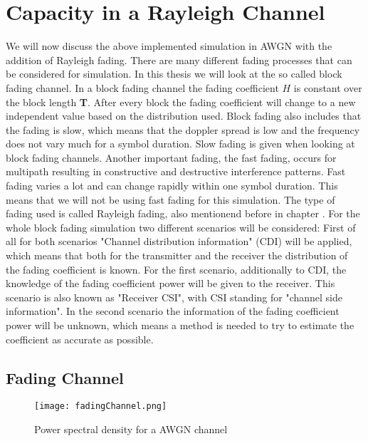 \chapter{Capacity in a Rayleigh Channel} 
\label{chap:raychan}
\graphicspath{{C:/Users/Kevin/Bachelarbeit/Bachelorarbeit/01_Bachelorarbeit_LaTex/02_Figures/}}


We will now discuss the above implemented simulation in AWGN with the addition of Rayleigh fading. 
There are many different fading processes that can be considered for simulation. In this thesis we will look at the so called block fading channel. In a block fading channel the fading coefficient $H$ is constant over the block length \textbf{T}. After every block the fading coefficient will change to a new independent value based on the distribution used. Block fading also includes that the fading is slow, which means that the doppler spread is low and the frequency does not vary much for a symbol duration. Slow fading is given when looking at block fading channels. Another important fading, the fast fading, occurs for multipath resulting in constructive and destructive interference patterns. Fast fading varies a lot and can change rapidly within one symbol duration. This means that we will not be using fast fading for this simulation.
The type of fading used is called Rayleigh fading, also mentionend before in chapter . For the whole block fading simulation two different scenarios will be considered:
\newline
First of all for both scenarios "Channel distribution information" (CDI) will be applied, which means that both for the transmitter and the receiver the distribution of the fading coefficient is known. For the first scenario, additionally to CDI, the knowledge of the fading coefficient power will be given to the receiver. This scenario is also known as "Receiver CSI", with CSI standing for "channel side information".
\newline
In the second scenario the information of the fading coefficient power will be unknown, which means a method is needed to try to estimate the coefficient as accurate as possible. 
\clearpage 
\section{Fading Channel}
\begin{figure}[!htb]
	\centering
	\texttt{[image: fadingChannel.png]}
	\caption{Power spectral density for a AWGN channel}
	\label{fig:AWGN}
\end{figure}

